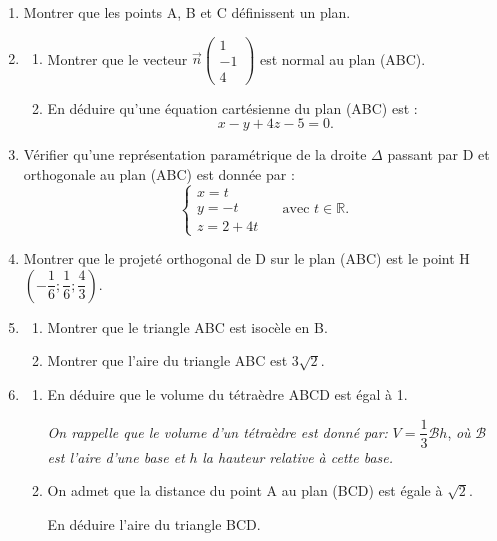 \documentclass[10pt]{article}
\providecommand{\R}{\mathbb{R}}
\providecommand{\vect}[1]{\overrightarrow{#1}}
\begin{document}
	\begin{enumerate}
		\item Montrer que les points A, B et C définissent un plan.
		\item \begin{enumerate}
			\item Montrer que le vecteur $\vect{n} \begin{pmatrix} 1 \\ -1 \\ 4 \end{pmatrix} $ est normal au plan (ABC).

			\item En déduire qu'une équation cartésienne du plan (ABC) est :
			\[x-y+4 z-5=0.\]
		\end{enumerate}

		\item Vérifier qu'une représentation paramétrique de la droite $\Delta$ passant par D et orthogonale au plan (ABC) est donnée par :
		\[\begin{cases}
			x=t \\
			y=-t \\
			z=2+4 t
		\end{cases} \quad \text { avec } t \in \R.\]
		\item Montrer que le projeté orthogonal de D sur le plan (ABC) est le point H$\left(-\dfrac{1}{6} ; \dfrac{1}{6} ; \dfrac{4}{3}\right)$.
		\item \begin{enumerate}
			\item Montrer que le triangle ABC est isocèle en B.

			\item Montrer que l'aire du triangle ABC est $3 \sqrt{2}$.
		\end{enumerate}

		\item \begin{enumerate}
			\item En déduire que le volume du tétraèdre ABCD est égal à 1.

			\emph{On rappelle que le volume d'un tétraèdre est donné par:} \quad $V=\dfrac{1}{3} \mathcal{B} h$,\quad \emph{ où } $\mathcal{B}$ \emph{est l'aire d'une base et} $h$ \emph{la hauteur relative à cette base.}

			\item On admet que la distance du point A au plan (BCD) est égale à $\sqrt{2}$.

			En déduire l'aire du triangle BCD.
		\end{enumerate}


\end{enumerate}
\end{document}
